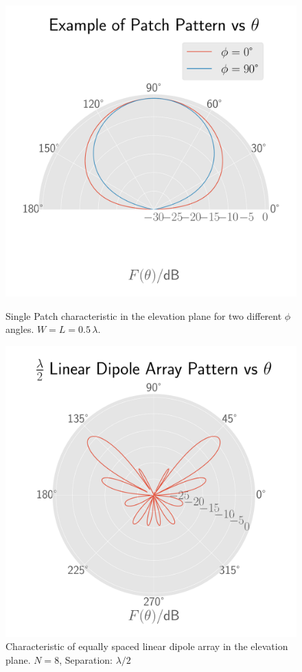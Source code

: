 \documentclass[10pt, a4paper]{article}
\begin{document}
\begin{figure}[H]
  \begin{minipage}[t]{0.45\textwidth}
    \centering
    \includegraphics[width=\textwidth]{graphics/patch_theta.pdf}
    \caption{Single Patch characteristic in the elevation plane for two different $\phi$ angles. $W=L=0.5\,\si{\lambda}$.}
  \end{minipage}\hfill
  \begin{minipage}[t]{0.45\textwidth}
    \centering
    \includegraphics[width=\textwidth]{graphics/dipole_array_theta.pdf}
    \caption{Characteristic of equally spaced linear dipole array in the elevation plane. $N=8$, Separation: $\lambda/2$}
  \end{minipage}
\end{figure}
\end{document}
